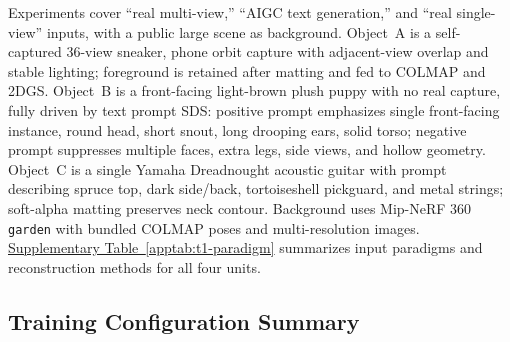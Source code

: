 \documentclass[10pt,twocolumn,letterpaper]{article}
\newcounter{apptab}
\newcommand{\apptabref}[1]{\hyperref[#1]{Supplementary Table~\ref*{#1}}}
\begin{document}
Experiments cover ``real multi-view,'' ``AIGC text generation,'' and ``real single-view'' inputs, with a public large scene as background. Object~A is a self-captured 36-view sneaker, phone orbit capture with adjacent-view overlap and stable lighting; foreground is retained after matting and fed to COLMAP and 2DGS. Object~B is a front-facing light-brown plush puppy with no real capture, fully driven by text prompt SDS: positive prompt emphasizes single front-facing instance, round head, short snout, long drooping ears, solid torso; negative prompt suppresses multiple faces, extra legs, side views, and hollow geometry. Object~C is a single Yamaha Dreadnought acoustic guitar with prompt describing spruce top, dark side/back, tortoiseshell pickguard, and metal strings; soft-alpha matting preserves neck contour. Background uses Mip-NeRF 360\cite{barron2022mipnerf360} \texttt{garden} with bundled COLMAP poses and multi-resolution images. \apptabref{apptab:t1-paradigm} summarizes input paradigms and reconstruction methods for all four units.

\subsection{Training Configuration Summary}
\end{document}
